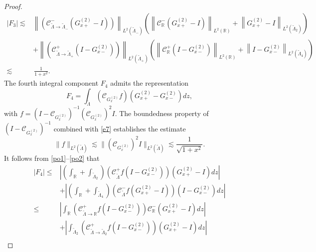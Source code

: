 \documentclass[10pt,a4paper]{amsart}
\begin{document}
\begin{proof}
\begin{align*}
\left|F_{3}\right|\lesssim&\left\|\left(\mathcal{C}_{\widetilde{\Lambda}\rightarrow\widetilde{\Lambda}_{-}}^{-}\left(G^{(2)}_{x+}-I\right)\right)\right\|_{L^{2}(\widetilde{\Lambda}_{-})}\left(\left\|\mathcal{C}_{\mathbb{R}}^{-}\left(G^{(2)}_{x+}-I\right)\right\|_{L^{2}(\mathbb{R})}+\left\|G^{(2)}_{x+}-I\right\|_{L^{2}(\widetilde{\Lambda}_{2})}\right)\\
&+\left\|\left(\mathcal{C}_{\widetilde{\Lambda}\rightarrow\widetilde{\Lambda}_{+}}^{+}\left(I-G^{(2)}_{x-}\right)\right)\right\|_{L^{2}(\widetilde{\Lambda}_{+})}\left(\left\|\mathcal{C}_{\mathbb{R}}^{+}\left(I-G^{(2)}_{x-}\right)\right\|_{L^{2}(\mathbb{R})}+\left\|I-G^{(2)}_{x-}\right\|_{L^{2}(\widetilde{\Lambda}_{4})}\right)\\
\lesssim&\,\frac{1}{1+x^{2}}.
\end{align*}
The fourth integral component $F_{4}$ admits the representation
\begin{equation*}
F_{4}=\int_{\widetilde{\Lambda}}\left(\mathcal{C}_{G^{(2)}_{x}}f\right)\left(G^{(2)}_{x+}-G^{(2)}_{x-}\right)dz,
\end{equation*}
with $f=(I-\mathcal{C}_{G^{(2)}_{x}})^{-1}(\mathcal{C}_{G^{(2)}_{x}})^{2}I$. The boundedness property of $(I-\mathcal{C}_{G^{(2)}_{x}})^{-1}$ combined with \eqref{e7} establishes the estimate
\begin{equation*}
\|f\|_{L^{2}(\widetilde{\Lambda})}\lesssim\|(\mathcal{C}_{G^{(2)}_{x}})^{2}I\|_{L^{2}(\widetilde{\Lambda})}\lesssim\frac{1}{\sqrt{1+x^{2}}}.
\end{equation*}
It follows from \eqref{po1}--\eqref{po2} that
\begin{equation*}
\begin{aligned}
\left|F_{4}\right|\leq&\left|\left(\int_{\mathbb{R}}+\int_{\widetilde{\Lambda}_{2}}\right)\left(\mathcal{C}_{\widetilde{\Lambda}}^{+}f\left(I-G^{(2)}_{x-}\right)\right)\left(G^{(2)}_{x+}-I\right)dz\right|\\
&+\left|\left(\int_{\mathbb{R}}+\int_{\widetilde{\Lambda}_{4}}\right)\left(\mathcal{C}_{\widetilde{\Lambda}}^{-}f\left(G^{(2)}_{x+}-I\right)\right)\left(I-G^{(2)}_{x-}\right)dz\right|\\
\leq&\left|\int_{\mathbb{R}}\left(\mathcal{C}_{\widetilde{\Lambda}\rightarrow\mathbb{R}}^{+}f\left(I-G^{(2)}_{x-}\right)\right)\mathcal{C}_{\mathbb{R}}^{-}\left(G^{(2)}_{x+}-I\right)dz\right|\\
&+\left|\int_{\widetilde{\Lambda}_{2}}\left(\mathcal{C}_{\widetilde{\Lambda}\rightarrow\widetilde{\Lambda}_{2}}^{+}f\left(I-G^{(2)}_{x-}\right)\right)\left(G^{(2)}_{x+}-I\right)dz\right|\\

\end{aligned}
\end{equation*}
\end{proof}
\end{document}
